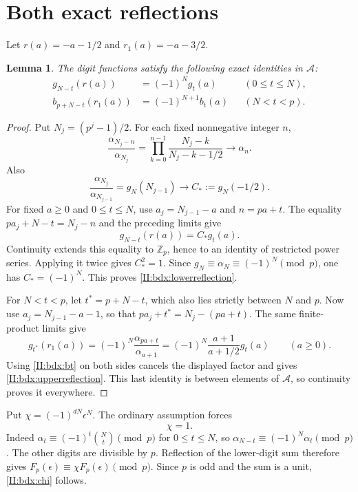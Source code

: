 \documentclass[11pt,letterpaper]{article}
\newtheorem{lemma}[theorem]{Lemma}
\theoremstyle{definition}
\theoremstyle{remark}
\begin{document}
\section{Both exact reflections}

Let $r(a)=-a-1/2$ and $r_1(a)=-a-3/2$.

\begin{lemma}\label{II:bdx:reflections}
The digit functions satisfy the following exact identities in
$\mathcal A$:
\begin{align}
 g_{N-t}(r(a))&=(-1)^N g_t(a)
                  &&(0\le t\le N),\label{II:bdx:lowerreflection}\\
 b_{p+N-t}(r_1(a))&=(-1)^{N+1}b_t(a)
                  &&(N<t<p).\label{II:bdx:upperreflection}
\end{align}
\end{lemma}
\begin{proof}
Put $N_j=(p^j-1)/2$. For each fixed nonnegative integer $n$,
\[
 \frac{\alpha_{N_j-n}}{\alpha_{N_j}}
   =\prod_{k=0}^{n-1}\frac{N_j-k}{N_j-k-1/2}
                 \longrightarrow\alpha_n.
\]
Also
\[
 \frac{\alpha_{N_j}}{\alpha_{N_{j-1}}}
      =g_N(N_{j-1})\longrightarrow C_*:=g_N(-1/2).
\]
For fixed $a\ge0$ and $0\le t\le N$, use
$a_j=N_{j-1}-a$ and $n=pa+t$. The equality
$pa_j+N-t=N_j-n$ and the preceding limits give
\[
 g_{N-t}(r(a))=C_*g_t(a).
\]
Continuity extends this equality to $\mathbb Z_p$, hence to an
identity of restricted power series. Applying it twice gives
$C_*^2=1$. Since $g_N\equiv\alpha_N\equiv(-1)^N\pmod p$,
one has $C_*=(-1)^N$. This proves \eqref{II:bdx:lowerreflection}.

For $N<t<p$, let $t^*=p+N-t$, which also lies strictly between $N$
and $p$. Now use $a_j=N_{j-1}-a-1$, so that
$pa_j+t^*=N_j-(pa+t)$. The same finite-product limits give
\[
 g_{t^*}(r_1(a))
   =(-1)^N\frac{\alpha_{pa+t}}{\alpha_{a+1}}
   =(-1)^N\frac{a+1}{a+1/2}g_t(a)
 \qquad(a\ge0).
\]
Using \eqref{II:bdx:bt} on both sides cancels the displayed factor and
gives \eqref{II:bdx:upperreflection}. This last identity is between
elements of $\mathcal A$, so continuity proves it everywhere.
\end{proof}

Put $\chi=(-1)^{dN}\epsilon^N$. The ordinary assumption forces
\begin{equation}\label{II:bdx:chi}
 \chi=1.
\end{equation}
Indeed $\alpha_t\equiv(-1)^t\binom Nt\pmod p$ for $0\le t\le N$,
so $\alpha_{N-t}\equiv(-1)^N\alpha_t\pmod p$.
The other digits are divisible by $p$. Reflection of the lower-digit
sum therefore gives $F_p(\epsilon)\equiv\chi F_p(\epsilon)\pmod p$.
Since $p$ is odd and the sum is a unit, \eqref{II:bdx:chi} follows.
\end{document}
